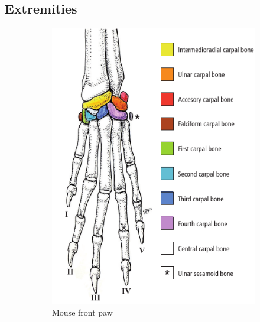 \subsection{Extremities}
\label{s:b-mouse-ext}
\begin{figure}[h]
	\begin{subfigure}{0.49\textwidth}
		\includegraphics[scale=0.5]{images/mouseFrontPaw.png}
		\caption{Mouse front paw \cite{ruberteMorphologicalMousePhenotyping2017}}\label{fig:frontPaw}
	\end{subfigure}
	\begin{subfigure}{0.49\textwidth}

\end{subfigure}
\end{figure}

